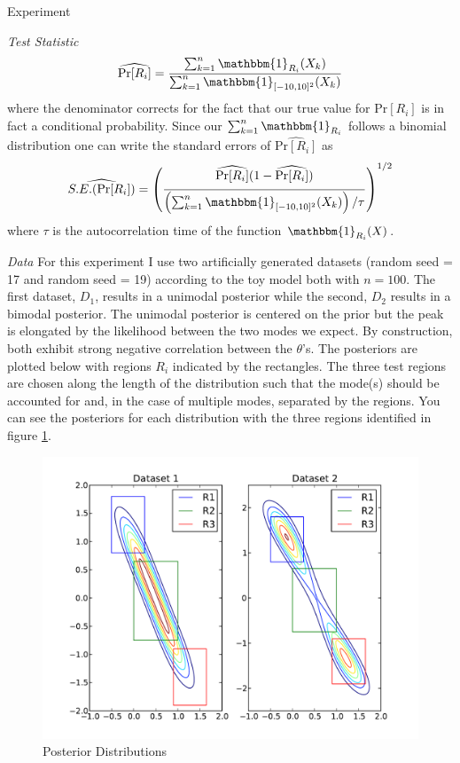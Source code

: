 \documentclass{article}
\newcommand{\Prob}[2]{\underset{#2}{\mbox{Pr}}\!\left[#1\right]}
\begin{document}
\begin{section}{Experiment}
\begin{subsection}{\it Test Statistic}
\begin{equation}
\widehat{\Prob{R_i}{}}=\frac{\sum_{k=1}^n \mathbbm{1}_{R_i}(X_k)}{\sum_{k=1}^n \mathbbm{1}_{[-10,10]^2}(X_k)} \label{estPr}
\end{equation}
where the denominator corrects for the fact that our true value for $\Prob{R_i}{}$ is in fact a conditional probability.  Since our $\sum_{k=1}^n \mathbbm{1}_{R_i}$ follows a binomial distribution one can write the standard errors of $\widehat{\Prob{R_i}{}}$ as
\begin{equation}
\widehat{S.E.(\Prob{R_i}{})} = \left( \frac{\widehat{\Prob{R_i}{}}(1-\widehat{\Prob{R_i}{}})}{\left(\sum_{k=1}^n \mathbbm{1}_{[-10,10]^2}(X_k)\right)/\tau}\right)^{1/2} \label{se}
\end{equation}
where $\tau$ is the autocorrelation time of the function $\mathbbm{1}_{R_i}(X)$.
\end{subsection}
\begin{subsection}{\it Data}
For this experiment I use two artificially generated datasets (random seed = 17 and random seed = 19) according to the toy model both with $n=100$.  The first dataset, $D_1$, results in a unimodal posterior while the second, $D_2$ results in a bimodal posterior.  The unimodal posterior is centered on the prior but the peak is elongated by the likelihood between the two modes we expect.  By construction, both exhibit strong negative correlation between the $\theta$'s.  The posteriors are plotted below with regions $R_i$ indicated by the rectangles.  The three test regions are chosen along the length of the distribution such that the mode(s) should be accounted for and, in the case of multiple modes, separated by the regions.  You can see the posteriors for each distribution with the three regions identified in  {figure \ref{distr}}.
\begin{figure}[h!]
\caption{Posterior Distributions}
\label{distr}
\begin{center}
\includegraphics[scale=0.7]{../figures/distr_dataset.pdf}
\end{center}
\end{figure}
\end{subsection}


\end{section}
\end{document}
